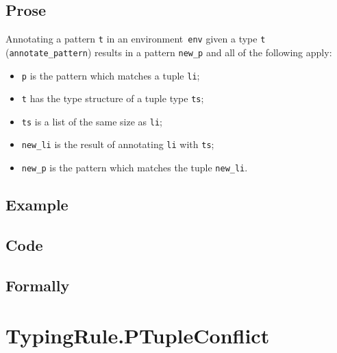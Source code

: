 \documentclass{book}
\begin{document}
  \subsection{Prose}
   Annotating a pattern \texttt{t} in an environment~\texttt{env} given a type \texttt{t} (\texttt{annotate\_pattern}) results in a pattern \texttt{new\_p} and all of the following apply:
   \begin{itemize}
   \item \texttt{p} is the pattern which matches a tuple \texttt{li};
   \item \texttt{t} has the type structure of a tuple type \texttt{ts};
   \item \texttt{ts} is a list of the same size as \texttt{li};
   \item \texttt{new\_li} is the result of annotating \texttt{li} with \texttt{ts};
   \item \texttt{new\_p} is the pattern which matches the tuple \texttt{new\_li}.
   \end{itemize}

  \subsection{Example}

  \subsection{Code}

\begin{emptyformal}
    \subsection{Formally}
\end{emptyformal}



\section{TypingRule.PTupleConflict \label{sec:TypingRule.PTupleConflict}}
\end{document}
